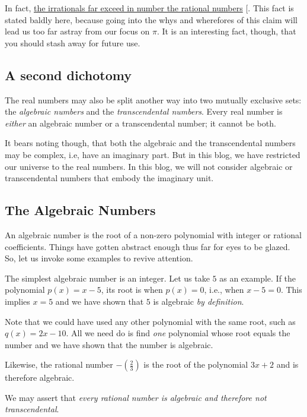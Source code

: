 \documentclass[
  a4paper,
]{article}
\begin{document}
In fact,
\href{https://socratic.org/questions/58c80a37b72cff29df40c794}{the
irrationals far exceed in number the rational numbers}
{[}\citeproc{ref-socratic}{6}{]}. This fact is stated baldly here,
because going into the whys and wherefores of this claim will lead us
too far astray from our focus on \(\pi\). It is an interesting fact,
though, that you should stash away for future use.

\subsection{A second dichotomy}\label{a-second-dichotomy}

The real numbers may also be split another way into two mutually
exclusive sets: the \emph{algebraic numbers} and the
\emph{transcendental numbers}. Every real number is \emph{either} an
algebraic number or a transcendental number; it cannot be both.

It bears noting though, that both the algebraic and the transcendental
numbers may be complex, i.e, have an imaginary part. But in this blog,
we have restricted our universe to the real numbers. In this blog, we
will not consider algebraic or transcendental numbers that embody the
imaginary unit.

\subsection{The Algebraic Numbers}\label{the-algebraic-numbers}

An algebraic number is the root of a non-zero polynomial with integer or
rational coefficients. Things have gotten abstract enough thus far for
eyes to be glazed. So, let us invoke some examples to revive attention.

The simplest algebraic number is an integer. Let us take \(5\) as an
example. If the polynomial \(p(x) = x - 5\), its root is when
\(p(x) = 0\), i.e., when \(x - 5 = 0\). This implies \(x = 5\) and we
have shown that \(5\) is algebraic \emph{by definition}.

Note that we could have used any other polynomial with the same root,
such as \(q(x) = 2x - 10\). All we need do is find \emph{one} polynomial
whose root equals the number and we have shown that the number is
algebraic.

Likewise, the rational number \(-(\frac{2}{3})\) is the root of the
polynomial \(3x + 2\) and is therefore algebraic.

We may assert that \emph{every rational number is algebraic and
therefore not transcendental}.
\end{document}
